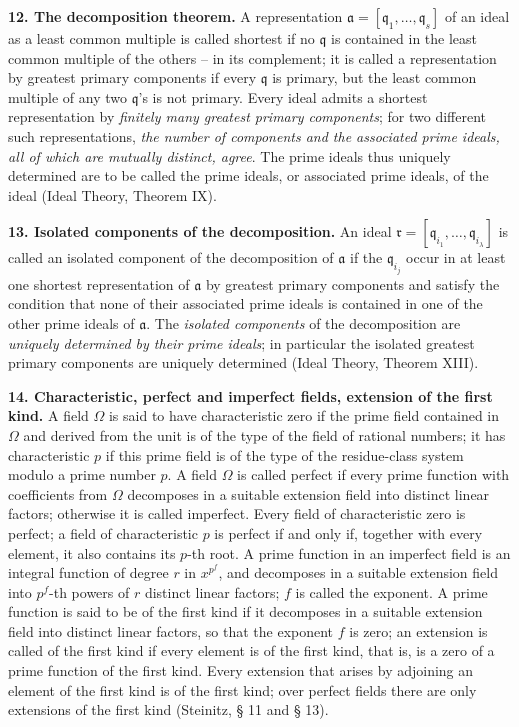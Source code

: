\documentclass[11pt]{article}
\providecommand{\frakq}{\mathfrak q}
\providecommand{\frakr}{\mathfrak r}
\providecommand{\fraka}{\mathfrak a}
\providecommand{\fraka}{\mathfrak a}
\providecommand{\frakq}{\mathfrak q}
\providecommand{\frakr}{\mathfrak r}
\begin{document}
\textbf{12. The decomposition theorem.} A representation $\fraka=[\frakq_1,\ldots,\frakq_s]$ of an ideal as a least common multiple is called shortest if no $\frakq$ is contained in the least common multiple of the others -- in its complement; it is called a representation by greatest primary components if every $\frakq$ is primary, but the least common multiple of any two $\frakq$'s is not primary. Every ideal admits a shortest representation by \emph{finitely many greatest primary components}; for two different such representations, \emph{the number of components and the associated prime ideals, all of which are mutually distinct, agree}. The prime ideals thus uniquely determined are to be called the prime ideals, or associated prime ideals, of the ideal (Ideal Theory, Theorem IX).

\textbf{13. Isolated components of the decomposition.} An ideal $\frakr=[\frakq_{i_1},\ldots,\frakq_{i_\lambda}]$ is called an isolated component of the decomposition of $\fraka$ if the $\frakq_{i_j}$ occur in at least one shortest representation of $\fraka$ by greatest primary components and satisfy the condition that none of their associated prime ideals is contained in one of the other prime ideals of $\fraka$. The \emph{isolated components} of the decomposition are \emph{uniquely determined by their prime ideals}; in particular the isolated greatest primary components are uniquely determined (Ideal Theory, Theorem XIII).

\textbf{14. Characteristic, perfect and imperfect fields, extension of the first kind.} A field $\Omega$ is said to have characteristic zero if the prime field contained in $\Omega$ and derived from the unit is of the type of the field of rational numbers; it has characteristic $p$ if this prime field is of the type of the residue-class system modulo a prime number $p$. A field $\Omega$ is called perfect if every prime function with coefficients from $\Omega$ decomposes in a suitable extension field into distinct linear factors; otherwise it is called imperfect. Every field of characteristic zero is perfect; a field of characteristic $p$ is perfect if and only if, together with every element, it also contains its $p$-th root. A prime function in an imperfect field is an integral function of degree $r$ in $x^{p^f}$, and decomposes in a suitable extension field into $p^f$-th powers of $r$ distinct linear factors; $f$ is called the exponent. A prime function is said to be of the first kind if it decomposes in a suitable extension field into distinct linear factors, so that the exponent $f$ is zero; an extension is called of the first kind if every element is of the first kind, that is, is a zero of a prime function of the first kind. Every extension that arises by adjoining an element of the first kind is of the first kind; over perfect fields there are only extensions of the first kind (Steinitz, § 11 and § 13).
\end{document}
